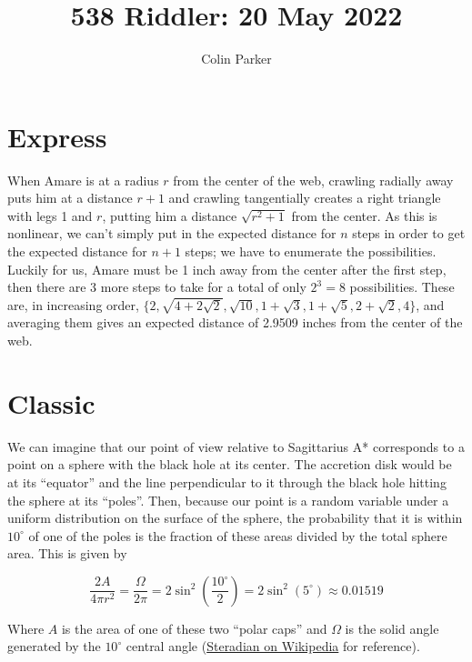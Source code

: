 \documentclass[11pt]{article} %
\title{538 Riddler: 20 May 2022}
\author{Colin Parker}
\begin{document}
\maketitle

\section{Express}

When Amare is at a radius $r$ from the center of the web, crawling radially away puts him at a distance $r + 1$ and
crawling tangentially creates a right triangle with legs 1 and $r$, putting him a distance $\sqrt{r^2 + 1}$ from the
center. As this is nonlinear, we can't simply put in the expected distance for $n$ steps in order to get the
expected distance for $n + 1$ steps; we have to enumerate the possibilities. Luckily for us, Amare must be 1 inch
away from the center after the first step, then there are 3 more steps to take for a total of only $2^3 = 8$ possibilities.
These are, in increasing order, $\{ 2, \sqrt{4 + 2\sqrt2}, \sqrt{10}, 1 + \sqrt3, 1 + \sqrt5, 2 + \sqrt2, 4 \}$,
and averaging them gives an expected distance of 2.9509 inches from the center of the web. 

\section{Classic}

We can imagine that our point of view relative to Sagittarius A* corresponds to a point on a sphere with the black
hole at its center. The accretion disk would be at its ``equator'' and the line perpendicular to it through the black hole
hitting the sphere at its ``poles''. Then, because our point is a random variable under a uniform distribution on the
surface of the sphere, the probability that it is within $10^{\circ}$ of one of the poles is the fraction of these areas
divided by the total sphere area. This is given by

$$\frac{2A}{4\pi r^2} = \frac{\Omega}{2\pi} = 2\sin^2\left(\frac{10^{\circ}}{2}\right) = 2\sin^2(5^{\circ}) \approx 0.01519$$

Where $A$ is the area of one of these two ``polar caps'' and $\Omega$ is the solid angle generated by the $10^{\circ}$
central angle (\href{https://en.wikipedia.org/wiki/Steradian}{Steradian on Wikipedia} for reference).
\end{document}
